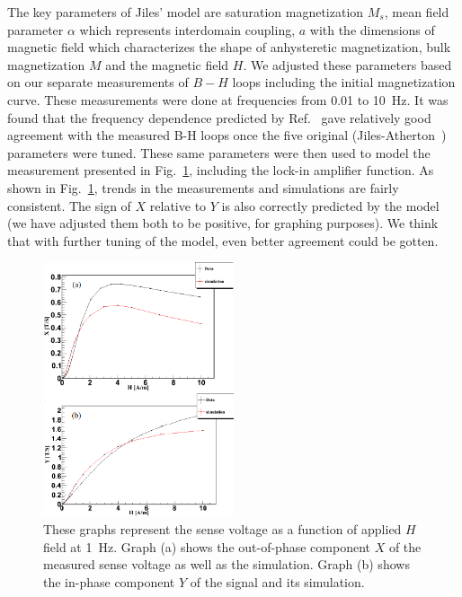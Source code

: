 The key parameters of Jiles' model are saturation magnetization $M_s$,
mean field parameter $\alpha$ which represents interdomain coupling,
$a$ with the dimensions of magnetic field which characterizes the
shape of anhysteretic magnetization, bulk magnetization $M$ and the
magnetic field $H$.  We adjusted these parameters based on our
separate measurements of $B-H$ loops including the initial
magnetization curve.  These measurements were done at frequencies from
0.01 to 10~Hz.  It was found that the frequency dependence predicted
by Ref.~\cite{bib:jiles} gave relatively good agreement with the
measured B-H loops once the five original
(Jiles-Atherton~\cite{bib:ja}) parameters were tuned.  These same
parameters were then used to model the measurement presented in
Fig.~\ref{fig:data_and_simulation}, including the lock-in amplifier
function.  As shown in Fig.~\ref{fig:data_and_simulation}, trends in
the measurements and simulations are fairly consistent.  The sign of
$X$ relative to $Y$ is also correctly predicted by the model (we have
adjusted them both to be positive, for graphing purposes).  We think
that with further tuning of the model, even better agreement could be
gotten.

\begin{figure}[h!]
\begin{center}
   \includegraphics[width=0.5\textwidth]{data_and_simulation3.PNG}
    \caption{These graphs represent the sense voltage as a function of applied $H$ field at 1~Hz. Graph (a) shows the out-of-phase component $X$ of the measured sense voltage as well as the simulation. Graph (b) shows the in-phase component $Y$ of the signal and its simulation.}
    \label{fig:data_and_simulation}
    \end{center}
\end{figure} 


